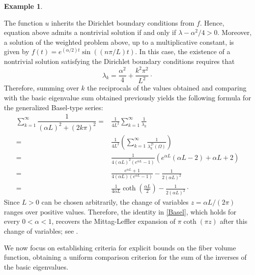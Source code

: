 \documentclass{amsart}
\theoremstyle{definition}
\newtheorem{example}[theorem]{Example}
\theoremstyle{remark}
\numberwithin{equation}{section}
\begin{document}
\begin{example}
\begin{enumerate}
The function $u$ inherits the Dirichlet boundary conditions from $f$. 
Hence, equation above admits a nontrivial solution if and only if $\lambda-\alpha^2/4>0$. Moreover, a solution of the weighted problem above, up to a multiplicative constant, is given by $f(t)=e^{(\alpha/2)t}\sin((n\pi/L)t)$. 
In this case, the existence of a nontrivial solution satisfying the Dirichlet boundary conditions requires that
\begin{equation*}
 \lambda_k = \frac{\alpha^2}{4} + \frac{k^2 \pi^2 }{L^2} \cdot
\end{equation*}
Therefore, summing over $k$ the reciprocals of the values obtained and comparing with the basic eigenvalue sum obtained previously yields the following formula for the generalized Basel-type series:
\begin{equation*}
\begin{aligned}\label{Basel}
 \sum_{k=1}^{\infty} \dfrac{1}{(\alpha L)^2 + (2 k \pi )^2} =& \frac{1}{4L^2}\sum_{k=1}^{\infty}\frac{1}{\lambda_k} \\
 =& \frac{1}{4L^2} \left(  \sum_{k=1}^{\infty}\frac{1}{\lambda_k^{\mathcal{D}}(\Omega)} \right) \\
 =& \frac{1}{4 (\alpha L)^2(e^{\alpha L}-1)}\left( e^{\alpha L}(\alpha L -2) + \alpha L + 2 \right) \\
 =& \frac{e^{\alpha L}+1}{4 (\alpha L)(e^{\alpha L}-1)}-\frac{1}{2(\alpha L)^2}\\
 =& \frac{1}{4\alpha L}\coth{\left( \frac{\alpha L}{2} \right)} - \frac{1}{2(\alpha L)^2} \cdot
 \end{aligned}
 \end{equation*}
Since $L>0$ can be chosen arbitrarily, the change of variables $z=\alpha L/(2\pi)$ ranges over positive values. Therefore, the identity in \eqref{Basel}, which holds for every $0<\alpha<1$, recovers the Mittag-Leffler expansion of $\pi\coth(\pi z)$ after this change of variables; see \cite[Chapter 7]{Ahlfors1979}.
\end{enumerate}
\end{example}


We now focus on establishing criteria for explicit bounds on the fiber volume function, obtaining a uniform comparison criterion for the sum of the inverses of the basic eigenvalues.
\end{document}
